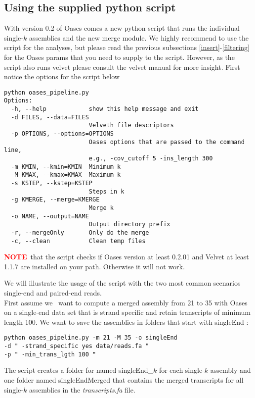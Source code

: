 \documentclass[12pt]{article}
\newcommand{\NOTE}{\textcolor{red}{\textbf{NOTE}}}
\begin{document}
\subsection{Using the supplied python script}
With version 0.2 of Oases comes a new python script that runs the individual single-$k$ assemblies and the new merge module. We highly recommend to use the script for the analyses, but please read the previous subsections \ref{insert}-\ref{filtering} for the Oases params that you need to supply to the script.  However, as the script also runs velvet please consult the velvet manual for more insight.
First notice the options for the script below \

\begin{verbatim}
python oases_pipeline.py
Options:
  -h, --help            show this help message and exit
  -d FILES, --data=FILES
                        Velveth file descriptors
  -p OPTIONS, --options=OPTIONS
                        Oases options that are passed to the command line,
                        e.g., -cov_cutoff 5 -ins_length 300
  -m KMIN, --kmin=KMIN  Minimum k
  -M KMAX, --kmax=KMAX  Maximum k
  -s KSTEP, --kstep=KSTEP
                        Steps in k
  -g KMERGE, --merge=KMERGE
                        Merge k
  -o NAME, --output=NAME
                        Output directory prefix
  -r, --mergeOnly       Only do the merge
  -c, --clean           Clean temp files
\end{verbatim}

\NOTE \ that the script checks if Oases version at least 0.2.01 and Velvet at least 1.1.7 are installed on your path. Otherwise it will not work.
 

We will illustrate the usage of the script with the two most common scenarios single-end and paired-end reads. \\
First assume we \ want to compute a merged assembly from 21 to 35 with Oases on a single-end data set that is strand specific and retain transcripts of minimum length 100. We want to save the assemblies in folders that start with singleEnd :
\begin{verbatim}
python oases_pipeline.py -m 21 -M 35 -o singleEnd 
-d " -strand_specific yes data/reads.fa "
-p " -min_trans_lgth 100 " 
\end{verbatim}

The script creates a folder for named singleEnd\_$k$ for each single-$k$ assembly and one folder named singleEndMerged that contains the merged transcripts for all single-$k$ assemblies in the \emph{transcripts.fa} file.
\end{document}
